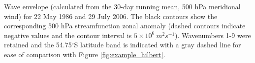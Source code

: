 \label{fig:example_envelope}
Wave envelope (calculated from the 30-day running mean, 500 hPa meridional wind) for 22 May 1986 and 29 July 2006. The black contours show the corresponding 500 hPa streamfunction zonal anomaly (dashed contours indicate negative values and the contour interval is $5 \times 10^6 \: m^2 s^{-1}$). Wavenumbers 1-9 were retained and the 54.75$^{\circ}$S latitude band is indicated with a gray dashed line for ease of comparison with Figure \ref{fig:example_hilbert}. 